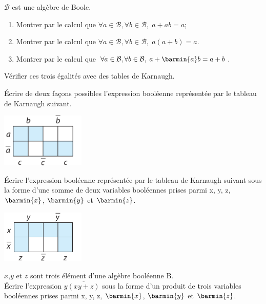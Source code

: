 \documentclass[a4paper,12pt,french]{article}
\begin{document}

\exo{}

$\mathcal{B}$ est une algèbre de Boole.

\begin{enumerate}[\bfseries 1.]
	\item 	Montrer par le calcul que $\forall a\in\mathcal{B},\forall b\in\mathcal{B},\; a+ab = a$;
	\item 	Montrer par le calcul que $\forall a\in\mathcal{B},\forall b\in\mathcal{B},\; a(a+b) = a$.
	\item 	Montrer par le calcul que $\forall a\in\mathcal{B},\forall b\in\mathcal{B},\; a+\barmin{a}b = a+b$.
\end{enumerate}
Vérifier ces trois égalités avec des tables de Karnaugh.\\

\exo{}

\'Ecrire de deux façons possibles l'expression booléenne représentée par le tableau de Karnaugh suivant.
\begin{center}
	\includegraphics[width=4cm]{ex29.png}
\end{center}
\exo{}

\'Ecrire l'expression booléenne représentée par le tableau de Karnaugh suivant sous la forme d'une somme de deux variables booléennes prises parmi x, y, z, $\barmin{x}
$, $\barmin{y}$ et $\barmin{z}$.
\begin{center}
	\includegraphics[width=4cm]{ex30.png}
\end{center}

\exo{}

$x$,$y$ et $z$ sont trois élément d'une algèbre booléenne B.\\

\'Ecrire l'expression $y\overline{(xy+z)}$ sous la forme d'un produit de trois variables booléennes prises parmi x, y, z, $\barmin{x}
$, $\barmin{y}$ et $\barmin{z}$.\\
\end{document}
